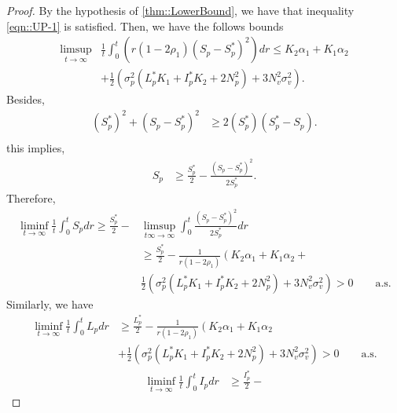 \begin{proof}
		By the hypothesis of \autoref{thm::LowerBound}, 
	we have that inequality \autoref{eqn::UP-1} 
	is satisfied. Then, we have the follows bounds
	 \begin{align*}
	 	\limsup
	 		\limits_{t \to \infty}
		 	&
		 	\frac{1}{t}
		 	\int_{0}^{t}
		 	(	r (1 - 2 \rho_1)
		 		\left(
		 			S_p - S_p ^* 
		 		\right) ^2 
		 	)
		 	dr 
		 	\leq 
		 	K_2 \alpha_1 + 
		 	K_1 \alpha_2
		 \\
 		&+
 			\frac{1}{2}
 			\left(
 				\sigma_p^2 
 				(
 					L_p ^* K_1 + 
 					I_p ^ *K_2 + 
 					2 N_p ^ 2
 				) + 
 				3 N_v ^ 2 \sigma_v^2
 			\right).
	\end{align*}
 Besides, 
 \begin{align*}
 	(S_p ^* ) ^ 2 + 
 	(S_p - S_p ^* ) ^ 2
 	&\geq
 	2(S_p ^ *)
 	(S_p ^ * - S_p).
 	\\
 \end{align*}
this implies,
\begin{align*}
	S_p
 		&\geq
 			\frac{S_p ^ *}{2} - 
 			\frac{(S_p - S_p^*)^2}{2 S_p^*}.
\end{align*}
Therefore,
	\begin{align*}
 		\liminf
 		\limits_{t \to \infty}
 		\frac{1}{t}
 		\int_{0} ^ {t} S_p dr
 		\geq
 		\frac{S_p^*}{2}
 		-& 
 		\limsup_{t\infty \to \infty}
 		\int_{0}^{t}
 			\frac{(S_p - S_p ^* )^2}{2S_p^*} 
 		dr
 		\\
	 	&\geq
	 		\frac{S_p^*}{2} - 
	 		\frac{1}{r(1-2\rho_1)}
	 		\left(
	 			K_2 \alpha_1 + 
	 			K_1 \alpha_2
	 		\right. +
 			\\
 			&
 			\frac{1}{2}
 			\left(
 				\sigma_p ^ 2 
 				(
 					L_p ^* K_1 + 
 					I_p ^* K_2 + 2N_p^2
 				) + 
 				3 N_v ^ 2
 				\sigma_v ^ 2
 			\right)
 			>0\qquad\mbox{a.s.}
	\end{align*}
%
	Similarly, we have
	\begin{align*}
	 	\liminf
	 	\limits_{t \to \infty}
	 	\frac{1}{t}\int_{0}^{t} L_p dr
	 	&\geq
	 	\frac{L_p^*}{2} - 
	 	\frac{1}{ r(1 - 2 \rho_1)}
	 	\left(
	 		K_2 \alpha_1 + 
	 		K_1 \alpha_2
	 	\right.
	 	\\
	 	&+
	 	\frac{1}{2}
	 	\left(
	 		\sigma_p^2(
	 			L_p ^ *K_1 + 
	 			I_p ^* K_2 + 
	 			2 N_p ^ 2
	 		) + 
	 		3 N_v ^ 2 \sigma_v ^ 2
	 	\right)
	 	>0 \qquad\mbox{a.s.}
	\end{align*}
	\begin{align*}
	 	\liminf
	 	\limits_{t \to \infty}
	 	\frac{1}{t}
	 	\int_{0} ^ {t} I_p dr
	 	&
	 	\geq
	 	\frac{I_p ^ *}{2} - 

\end{align*}
\end{proof}
